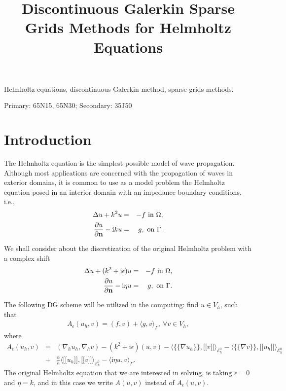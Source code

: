 \documentclass[final,leqno]{siamltex704}
\title{Discontinuous Galerkin Sparse Grids Methods for Helmholtz Equations}
\author{
}
\def\ljump{{[\![}}
\def\rjump{{]\!]}}
\def\lavg{{\{\!\{}}
\def\ravg{{\}\!\}}}
\begin{document}
\maketitle

\begin{abstract}
\end{abstract}

\begin{keywords}
Helmholtz equations, discontinuous Galerkin method, sparse grids methods.
\end{keywords}

\begin{AMS}
Primary: 65N15, 65N30; Secondary: 35J50
\end{AMS}
\pagestyle{myheadings}

\section{Introduction}
The Helmholtz equation is the simplest possible model of wave propagation. Although most applications are concerned with the propagation of waves in exterior domains, it is common to use as a model problem the Helmholtz equation posed in an interior domain with an impedance boundary conditions, i.e.,
\begin{eqnarray}
\Delta u+k^2 u &=& -f \mbox{ in }\Omega,\\
\frac{\partial u}{\partial \bf n}-\text{i}ku &=& g,\mbox{ on }\Gamma.
\end{eqnarray}

We shall consider about the discretization of the original Helmholtz problem with a complex shift
\begin{eqnarray}
\Delta u+(k^2+\text{i}\epsilon) u &=& -f \mbox{ in }\Omega,\\
\frac{\partial u}{\partial \bf n}-\text{i}\eta u &=& g,\mbox{ on }\Gamma.
\end{eqnarray}

The following DG scheme will be utilized in the computing: find $u\in V_h$, such that
\begin{eqnarray}
A_{\epsilon}(u_h,v) = (f,v)+\langle g,v \rangle_{\Gamma},\ \forall v\in V_h,
\end{eqnarray}
where
\begin{eqnarray*}
A_{\epsilon}(u_h,v)&=&(\nabla_h u_h,\nabla_h v)-(k^2+\text{i}\epsilon)(u,v)-\langle\lavg\nabla u_h\ravg,\ljump v\rjump\rangle_{\mathcal{E}_h^0}-\langle\lavg\nabla v\ravg,\ljump u_h\rjump\rangle_{\mathcal{E}_h^0}\\
&+&\frac{\alpha}{h}\langle\ljump u_h\rjump,\ljump v\rjump\rangle_{\mathcal{E}_h^0}-\langle\text{i}\eta u,v\rangle_{\Gamma}.
\end{eqnarray*}
The original Helmholtz equation that we are interested in solving, is taking $\epsilon = 0$ and $\eta = k$, and in this case we write $A(u,v)$ instead of $A_{\epsilon}(u,v)$.
\end{document}
